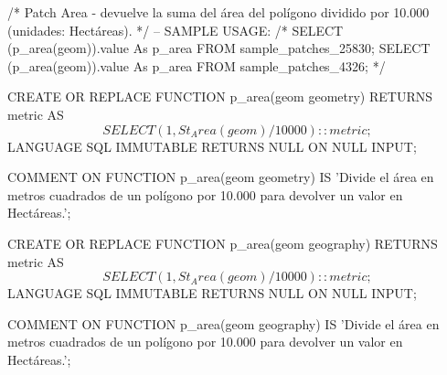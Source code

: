 \lstset{caption=Crear una función para calcular el IDW (I),label= IDW1}
\begin{SQL}
/*
Patch Area - devuelve la suma del área del polígono dividido por 10.000 (unidades: Hectáreas).
*/
-- SAMPLE USAGE:
/*
SELECT (p_area(geom)).value As p_area FROM sample_patches_25830;
SELECT (p_area(geom)).value As p_area FROM sample_patches_4326;
*/

CREATE OR REPLACE FUNCTION p_area(geom geometry)
RETURNS metric AS 
$$

SELECT (1, St_Area(geom)/10000)::metric;

$$
LANGUAGE SQL
IMMUTABLE
RETURNS NULL ON NULL INPUT;

COMMENT ON FUNCTION p_area(geom geometry) IS 'Divide el área en metros cuadrados de un polígono por 10.000 para devolver un valor en Hectáreas.';


CREATE OR REPLACE FUNCTION p_area(geom geography)
RETURNS metric AS 
$$

SELECT (1, St_Area(geom)/10000)::metric;

$$
LANGUAGE SQL
IMMUTABLE
RETURNS NULL ON NULL INPUT;

COMMENT ON FUNCTION p_area(geom geography) IS 'Divide el área en metros cuadrados de un polígono por 10.000 para devolver un valor en Hectáreas.';


\end{SQL}
